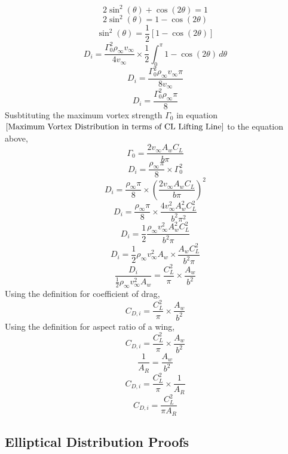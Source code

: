 \documentclass[a4paper, 12pt]{report}
\begin{document}
\begin{center}
$$2\sin^{2}(\theta) + \cos(2\theta) = 1$$
$$2\sin^{2}(\theta) = 1 - \cos(2\theta)$$
$$\sin^{2}(\theta) = \frac{1}{2}\left[1 - \cos(2\theta)\right]$$
$$D_{i} = \frac{\Gamma_{0}^{2}\rho_{\infty}v_{\infty}}{4v_{\infty}} \times \frac{1}{2}\int^{\pi}_{0}   1 - \cos(2\theta)   \,d\theta$$
$$D_{i} = \frac{\Gamma_{0}^{2}\rho_{\infty}v_{\infty}\pi}{8v_{\infty}}$$
\begin{equation}
D_{i} = \frac{\Gamma_{0}^{2}\rho_{\infty}\pi}{8}
\label{Induced Drag lifting line Thry}
\end{equation}
Susbtituting the maximum vortex strength $\Gamma_{0}$ in equation $\ref{Maximum Vortex Distribution in terms of CL Lifting Line}$ to the equation above,
$$\Gamma_{0} = \frac{2 v_{\infty}A_{w} C_{L}}{b\pi}$$
$$D_{i} = \frac{\rho_{\infty}\pi}{8} \times \Gamma_{0}^{2}$$
$$D_{i} = \frac{\rho_{\infty}\pi}{8} \times \left(\frac{2 v_{\infty}A_{w} C_{L}}{b\pi}\right)^{2}$$
$$D_{i} = \frac{\rho_{\infty}\pi}{8} \times  \frac{4 v_{\infty}^{2}A_{w}^{2} C_{L}^{2}}{b^{2}\pi^{2}} $$
$$D_{i} = \frac{1}{2}  \frac{\rho_{\infty}v_{\infty}^{2}A_{w}^{2} C_{L}^{2}}{b^{2}\pi} $$
$$D_{i} = \frac{1}{2}\rho_{\infty}v_{\infty}^{2}A_{w} \times \frac{A_{w} C_{L}^{2}}{b^{2}\pi} $$
$$\frac{D_{i}}{\displaystyle \frac{1}{2}\rho_{\infty}v_{\infty}^{2}A_{w}} = \frac{C_{L}^{2}}{\pi} \times\frac{A_{w}}{b^{2}}$$
Using the definition for coefficient of drag,
$$C_{D,i} = \frac{C_{L}^{2}}{\pi} \times\frac{A_{w}}{b^{2}}$$
Using the definition for aspect ratio of a wing,
$$C_{D,i} = \frac{C_{L}^{2}}{\pi} \times\frac{A_{w}}{b^{2}}$$
$$\frac{1}{A_{R}} = \frac{A_{w}}{b^{2}}$$
$$C_{D,i} = \frac{C_{L}^{2}}{\pi} \times\frac{1}{A_{R}}$$
\begin{equation}
C_{D,i} = \frac{C_{L}^{2}}{\pi A_{R}}
\label{Coefficient of Drag in terms of Coefficient of Lift Lifting Line Theory}
\end{equation}



\subsection{Elliptical Distribution Proofs}
\begin{comment}
\end{comment}




\end{center}
\end{document}
